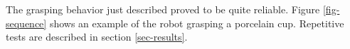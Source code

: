 The grasping behavior just described proved to be 
quite reliable. Figure \ref{fig-sequence} shows an example of the robot 
grasping a porcelain cup. Repetitive tests are described in section 
\ref{sec-results}.


